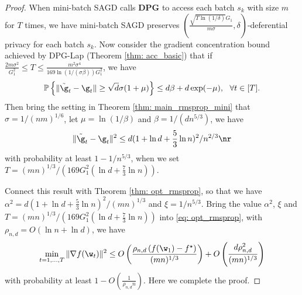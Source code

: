 \theomini*

\begin{proof} When mini-batch SAGD calls \textbf{DPG} to access each batch $s_k$ with size $m$ for $T$ times, we have mini-batch SAGD preserves $(\frac{\sqrt{T \ln(1/\delta)} G_1}{m\sigma}, \delta)$-deferential privacy for each batch $s_k$. Now consider the gradient concentration bound achieved by DPG-Lap (Theorem \ref{thm: acc_basic}) that if $ \frac{2m\sigma^2}{G_1^2}\leq T \leq \frac{m^2 \sigma^4}{169 \ln(1/(\sigma \beta))G_1^2}$, we have 
\begin{align*}
\mathbb{P}\left\{\|\tilde \g_t - \g_t\| \geq \sqrt{d}\sigma(1+\mu)\right\} \leq d\beta + d\exp(-\mu), \ \ \forall t \in [T]. 
\end{align*}
Then bring the setting in Theorem \ref{thm: main_rmsprop_mini} that $\sigma = 1/(nm)^{1/6}$, let $\mu = \ln (1/\beta)$ and $\beta = 1/(d n^{5/3})$, we have
\begin{equation}
 \|\tilde \g_t - \g_t\|^2 \leq d(1+\ln d + \frac{5}{3}\ln n)^2/n^{2/3}   \nr
\end{equation}
with probability at least $1- 1/n^{5/3}$, when we set\\ $T = (mn)^{1/3}/\left(169G_1^2(\ln d + \frac{7}{3}\ln n)\right)$. 


Connect this result with Theorem \ref{thm: opt_rmsprop}, so that we have $\alpha^2 = d(1+\ln d + \frac{5}{3}\ln n)^2/(mn)^{1/3}$ and $\xi = 1/n^{5/3}$. Bring the value $\alpha^2$, $\xi$ and $T = (mn)^{1/3}/\left(169G_1^2(\ln d + \frac{7}{3}\ln n)\right)$ into \eqref{eq: opt_rmsprop}, with $\rho_{n,d} = O \left(\ln n + \ln d \right)$, we have
\begin{align*}
\min_{t = 1,..., T}\|\nabla f(\w_t)\|^2 \leq O\left( \frac{\rho_{n,d} \left(f(\w_1) - f^\star \right)}{(mn)^{1/3}} \right) + O \left( \frac{d \rho_{n,d}^2}{(mn)^{1/3}}\right)
\end{align*} 
with probability at least $1-O\left(\frac{1}{\rho_{n,d} n}\right)$. Here we complete the proof.

\end{proof}

